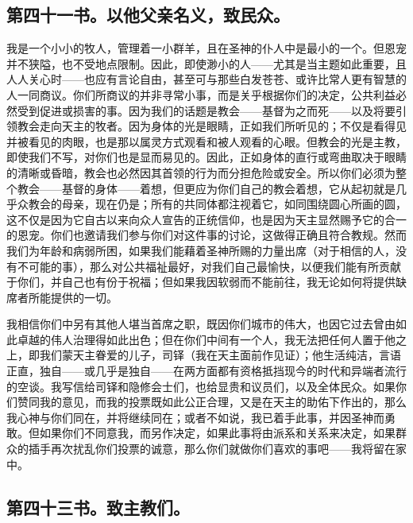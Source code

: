 
\subsection{第四十一书。以他父亲名义，致民众。}

我是一个小小的牧人，管理着一小群羊，且在圣神的仆人中是最小的一个。但恩宠并不狭隘，也不受地点限制。因此，即使渺小的人——尤其是当主题如此重要，且人人关心时——也应有言论自由，甚至可与那些白发苍苍、或许比常人更有智慧的人一同商议。你们所商议的并非寻常小事，而是关乎根据你们的决定，公共利益必然受到促进或损害的事。因为我们的话题是教会——基督为之而死——以及将要引领教会走向天主的牧者。因为身体的光是眼睛，正如我们所听见的；不仅是看得见并被看见的肉眼，也是那以属灵方式观看和被人观看的心眼。但教会的光是主教，即使我们不写，对你们也是显而易见的。因此，正如身体的直行或弯曲取决于眼睛的清晰或昏暗，教会也必然因其首领的行为而分担危险或安全。所以你们必须为整个教会——基督的身体——着想，但更应为你们自己的教会着想，它从起初就是几乎众教会的母亲，现在仍是；所有的共同体都注视着它，如同围绕圆心所画的圆，这不仅是因为它自古以来向众人宣告的正统信仰，也是因为天主显然赐予它的合一的恩宠。你们也邀请我们参与你们对这件事的讨论，这做得正确且符合教规。然而我们为年龄和病弱所困，如果我们能藉着圣神所赐的力量出席（对于相信的人，没有不可能的事），那么对公共福祉最好，对我们自己最愉快，以便我们能有所贡献于你们，并自己也有份于祝福；但如果我因软弱而不能前往，我无论如何将提供缺席者所能提供的一切。\par

我相信你们中另有其他人堪当首席之职，既因你们城市的伟大，也因它过去曾由如此卓越的伟人治理得如此出色；但在你们中间有一个人，我无法把任何人置于他之上，即我们蒙天主眷爱的儿子，司铎（我在天主面前作见证）；他生活纯洁，言语正直，独自——或几乎是独自——在两方面都有资格抵挡现今的时代和异端者流行的空谈。我写信给司铎和隐修会士们，也给显贵和议员们，以及全体民众。如果你们赞同我的意见，而我的投票既如此公正合理，又是在天主的助佑下作出的，那么我心神与你们同在，并将继续同在；或者不如说，我已着手此事，并因圣神而勇敢。但如果你们不同意我，而另作决定，如果此事将由派系和关系来决定，如果群众的插手再次扰乱你们投票的诚意，那么你们就做你们喜欢的事吧——我将留在家中。\par


\subsection{第四十三书。致主教们。}

